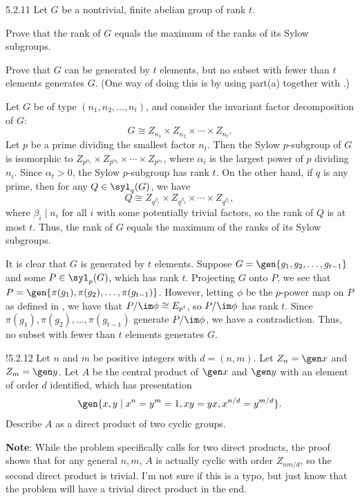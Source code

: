 \begin{exercise}{5.2.11}
    Let $G$ be a nontrivial, finite abelian group of rank $t$.
    \begin{subexercises}
        \item Prove that the rank of $G$ equals the maximum of the ranks of its Sylow subgroups.
        \item Prove that $G$ can be generated by $t$ elements, but no subset with fewer than $t$ elements generates $G$. (One way of doing this is by using part(a) together with .)
    \end{subexercises}
\end{exercise}

\begin{solenum}
    \item Let $G$ be of type $(n_1, n_2, \ldots, n_t)$, and consider the invariant factor decomposition of $G$:
    \[
    	G \cong Z_{n_1} \times Z_{n_2} \times \cdots \times Z_{n_t}.
    \]
    Let $p$ be a prime dividing the smallest factor $n_t$.
	Then the Sylow $p$-subgroup of $G$ is isomorphic to $Z_{p^{\alpha_1}} \times Z_{p^{\alpha_2}} \times \cdots \times Z_{p^{\alpha_t}}$, where $\alpha_i$ is the largest power of $p$ dividing $n_i$.
	Since $\alpha_t > 0$, the Sylow $p$-subgroup has rank $t$.
	On the other hand, if $q$ is any prime, then for any $Q \in \syl_q(G)$, we have
    \[
    	Q \cong Z_{q^{\beta_1}} \times Z_{q^{\beta_2}} \times \cdots \times Z_{q^{\beta_t}},
    \]
    where $\beta_i \mid n_i$ for all $i$ with some potentially trivial factors, so the rank of $Q$ is at most $t$.
	Thus, the rank of $G$ equals the maximum of the ranks of its Sylow subgroups.
    \item It is clear that $G$ is generated by $t$ elements.
	Suppose $G = \gen{g_1, g_2, \ldots, g_{t-1}}$ and some $P \in \syl_p(G)$, which has rank $t$.
	Projecting $G$ onto $P$, we see that $P = \gen{\pi(g_1), \pi(g_2), \ldots, \pi(g_{t-1})}$.
	However, letting $\phi$ be the $p$-power map on $P$ as defined in , we have that $P/\im\phi \cong E_{p^t}$, so $P/\im\phi$ has rank $t$.
	Since $\pi(g_1), \pi(g_2), \ldots, \pi(g_{t-1})$ generate $P/\im\phi$, we have a contradiction.
	Thus, no subset with fewer than $t$ elements generates $G$.
\end{solenum}

\begin{exercise}!{5.2.12}
    Let $n$ and $m$ be positive integers with $d = (n, m)$.
	Let $Z_n = \gen x$ and $Z_m = \gen y$.
	Let $A$ be the central product of $\gen x$ and $\gen y$ with an element of order $d$ identified, which has presentation
    \[
    	\gen{x, y \mid x^n = y^m = 1, xy = yx, x^{n/d} = y^{m/d}}.
    \]
    Describe $A$ as a direct product of two cyclic groups.
    
    \noindent\textbf{Note}: While the problem specifically calls for two direct products, the proof shows that for any general $n, m$, $A$ is actually cyclic with order $Z_{nm/d}$, so the second direct product is trivial.
	I'm not sure if this is a typo, but just know that the problem will have a trivial direct product in the end.
\end{exercise}

